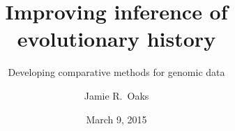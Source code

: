 \title[Improving inference of evolutionary history]{Improving inference of evolutionary history}
\subtitle{Developing comparative methods for genomic data}

\author[J.\ Oaks]{
    Jamie R.\ Oaks
}

\date{March 9, 2015}
